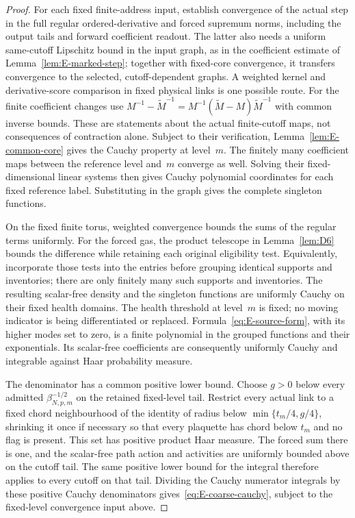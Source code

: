 \begin{proof}
For each fixed finite-address input, establish convergence of the actual step in the full regular ordered-derivative and forced supremum norms, including the output tails and forward coefficient readout. The latter also needs a uniform same-cutoff Lipschitz bound in the input graph, as in the coefficient estimate of Lemma~\ref{lem:E-marked-step}; together with fixed-core convergence, it transfers convergence to the selected, cutoff-dependent graphs. A weighted kernel and derivative-score comparison in fixed physical links is one possible route. For the finite coefficient changes use $M^{-1}-\widetilde M^{-1}=M^{-1}(\widetilde M-M)\widetilde M^{-1}$ with common inverse bounds. These are statements about the actual finite-cutoff maps, not consequences of contraction alone. Subject to their verification, Lemma~\ref{lem:E-common-core} gives the Cauchy property at level~$m$. The finitely many coefficient maps between the reference level and~$m$ converge as well. Solving their fixed-dimensional linear systems then gives Cauchy polynomial coordinates for each fixed reference label. Substituting in the graph gives the complete singleton functions.

On the fixed finite torus, weighted convergence bounds the sums of the regular terms uniformly. For the forced gas, the product telescope in Lemma~\ref{lem:D6} bounds the difference while retaining each original eligibility test. Equivalently, incorporate those tests into the entries before grouping identical supports and inventories; there are only finitely many such supports and inventories. The resulting scalar-free density and the singleton functions are uniformly Cauchy on their fixed health domains. The health threshold at level~$m$ is fixed; no moving indicator is being differentiated or replaced. Formula~\eqref{eq:E-source-form}, with its higher modes set to zero, is a finite polynomial in the grouped functions and their exponentials. Its scalar-free coefficients are consequently uniformly Cauchy and integrable against Haar probability measure.

The denominator has a common positive lower bound. Choose $g>0$ below every admitted $\beta_{N,p,m}^{-1/2}$ on the retained fixed-level tail. Restrict every actual link to a fixed chord neighbourhood of the identity of radius below $\min\{t_m/4,g/4\}$, shrinking it once if necessary so that every plaquette has chord below $t_m$ and no flag is present. This set has positive product Haar measure. The forced sum there is one, and the scalar-free path action and activities are uniformly bounded above on the cutoff tail. The same positive lower bound for the integral therefore applies to every cutoff on that tail. Dividing the Cauchy numerator integrals by these positive Cauchy denominators gives~\eqref{eq:E-coarse-cauchy}, subject to the fixed-level convergence input above.
\end{proof}

